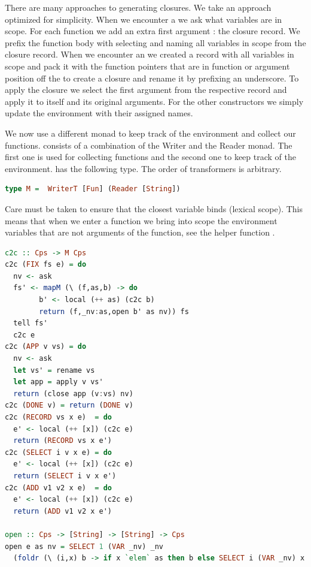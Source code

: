{There are many approaches to generating closures. We take an approach optimized for simplicity. When we encounter a  we ask what variables are in scope. For each function we add an extra first argument : the closure record. We prefix the function body with selecting and naming all variables in scope from the closure record. When we encounter an  we created a record with all variables in scope and pack it with the function pointers that are in function or argument position off the  to create a closure and rename it by prefixing an underscore. To apply the closure we select the first argument from the respective record and apply it to itself and its original arguments. For the other constructors we simply update the environment with their assigned names.

We now use a different monad  to keep track of the environment and collect our functions.  consists of a combination of the Writer and the Reader monad. The first one is used for collecting functions and the second one to keep track of the environment.  has the following type. The order of transformers is arbitrary.

\begin{lstlisting}[language=Haskell]
type M =  WriterT [Fun] (Reader [String])
\end{lstlisting}

Care must be taken to ensure that the closest variable binds (lexical scope). This means that when we enter a function we bring into scope the environment variables that are not arguments of the function, see the helper function .

\begin{lstlisting}[language=Haskell]
c2c :: Cps -> M Cps
c2c (FIX fs e) = do
  nv <- ask
  fs' <- mapM (\ (f,as,b) -> do
        b' <- local (++ as) (c2c b)
        return (f,_nv:as,open b' as nv)) fs
  tell fs'
  c2c e
c2c (APP v vs) = do
  nv <- ask
  let vs' = rename vs
  let app = apply v vs'
  return (close app (v:vs) nv)
c2c (DONE v) = return (DONE v)
c2c (RECORD vs x e)  = do
  e' <- local (++ [x]) (c2c e)
  return (RECORD vs x e')
c2c (SELECT i v x e) = do
  e' <- local (++ [x]) (c2c e)
  return (SELECT i v x e')
c2c (ADD v1 v2 x e)  = do
  e' <- local (++ [x]) (c2c e)
  return (ADD v1 v2 x e')

open :: Cps -> [String] -> [String] -> Cps
open e as nv = SELECT 1 (VAR _nv) _nv
  (foldr (\ (i,x) b -> if x `elem` as then b else SELECT i (VAR _nv) x b) e (zip [0..] nv))


\end{lstlisting}}
